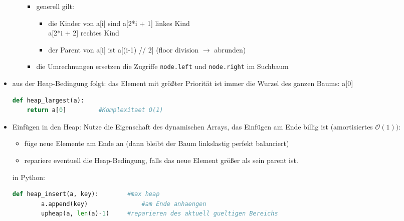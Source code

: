 \documentclass[11pt, fleqn]{scrreprt}
\begin{document}
\begin{itemize}
\begin{itemize}
\begin{itemize}
				\item generell gilt:
				\begin{itemize}
					\item die Kinder von a[i] sind a[2*i + 1] linkes Kind \\
					\hspace*{8cm} a[2*i + 2] rechtes Kind
					\item der Parent von a[i] ist a[(i-1) // 2] (floor division $\rightarrow$ abrunden)
				\end{itemize}
				\item die Umrechnungen ersetzen die Zugriffe \verb|node.left| und \verb|node.right| im Suchbaum
			\end{itemize}
		\end{itemize}
		\item aus der Heap-Bedingung folgt: das Element mit größter Priorität ist immer die Wurzel des ganzen Baums: a[0]
		\begin{lstlisting}[language=Python]
def heap_largest(a):
	return a[0]			#Komplexitaet O(1)
		\end{lstlisting}
		\item Einfügen in den Heap: Nutze die Eigenschaft des dynamischen Arrays, das Einfügen am Ende billig ist (amortisiertes $\mathcal{O}(1))$:
		\begin{itemize}
			\item füge neue Elemente am Ende an (dann bleibt der Baum linkslastig perfekt balanciert)
			\item repariere eventuell die Heap-Bedingung, falls das neue Element größer als sein parent ist.
		\end{itemize}
		in Python:
		\begin{lstlisting}[language=Python]
	def heap_insert(a, key):		#max heap
		a.append(key)				#am Ende anhaengen
		upheap(a, len(a)-1)		#reparieren des aktuell gueltigen Bereichs
	

\end{lstlisting}
\end{itemize}
\end{document}
